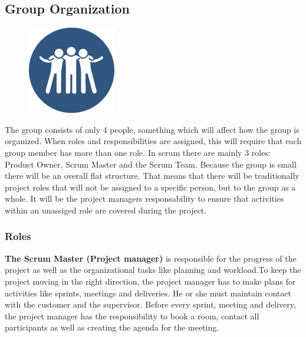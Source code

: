 \clearpage
\subsection{Group Organization}

\begin{figure}
  \begin{center}
  \includegraphics[scale=0.7]{pictures/team.png}
  \end{center}
\end{figure}

The group consists of only 4 people, something which will affect how the group is organized. When roles and responsibilities are assigned, this will require that each group member has more than one role. In scrum there are mainly 3 roles: Product Owner, Scrum Master and the Scrum Team. Because the group is small there will be an overall flat structure. That means that
there will be traditionally project roles that will not be assigned to a specific person, but to the group as a whole. It will be the project managers responsability to ensure that activities within an unassiged role are covered during the project.

\subsubsection{Roles}

{\bf The Scrum Master (Project manager)} is responsible for the progress of the project as well as the organizational tasks like planning and workload.To keep the project moving in the right direction, the project manager has to make plans for activities like sprints, meetings and deliveries. He or she must maintain contact with the customer and the supervisor.
Before every sprint, meeting and delivery, the project manager has the responsibility to book a room, contact all
participants as well as creating the agenda for the meeting. \\

